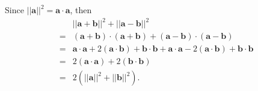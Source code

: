 \documentclass[../hw9]{subfiles}
\begin{document}
Since ${||\mathbf{a}||}^2=\mathbf{a}\cdot\mathbf{a}$, then
\begin{align*}
    &{||\mathbf{a}+\mathbf{b}||}^2+{||\mathbf{a}-\mathbf{b}||}^2\\
    =&(\mathbf{a}+\mathbf{b})\cdot(\mathbf{a}+\mathbf{b})+(\mathbf{a}-\mathbf{b})\cdot(\mathbf{a}-\mathbf{b})\\
    =&\mathbf{a}\cdot\mathbf{a}+2(\mathbf{a}\cdot\mathbf{b})+\mathbf{b}\cdot\mathbf{b}+\mathbf{a}\cdot\mathbf{a}-2(\mathbf{a}\cdot\mathbf{b})+\mathbf{b}\cdot\mathbf{b}\\
    =&2(\mathbf{a}\cdot\mathbf{a})+2(\mathbf{b}\cdot\mathbf{b})\\
    =&2({||\mathbf{a}||}^2+{||\mathbf{b}||}^2).
\end{align*}
\end{document}
